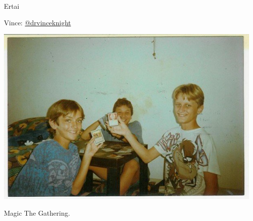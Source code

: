 \documentclass{beamer}
\begin{document}
    \begin{frame}
        \begin{center}
            \Huge
                Ertai

               \vfill

            \Large
               Vince: \href{https://twitter.com/drvinceknight}{@drvinceknight}\\
        \end{center}

    \end{frame}

    \begin{frame}
        \begin{center}
            \includegraphics[width=.8\textwidth]{./img/young_me_playing_magic/main.jpg}
        \end{center}

    \end{frame}

    \begin{frame}
        \begin{center}
            \Huge
            Magic The Gathering.
        \end{center}
    \end{frame}
\end{document}
